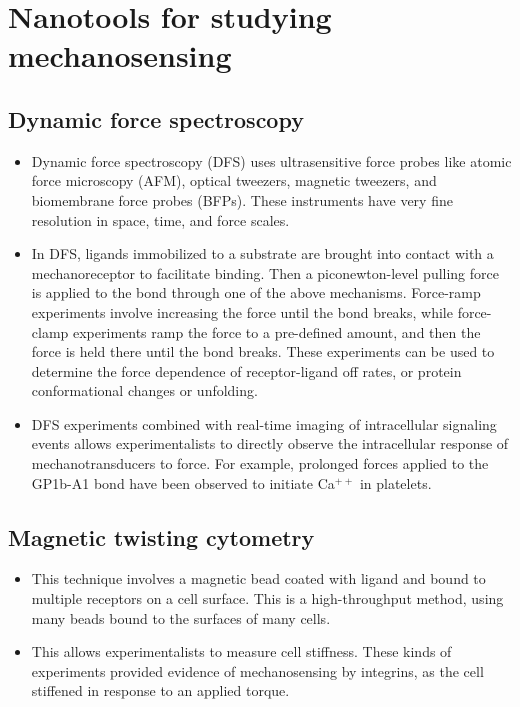 \documentclass[
10pt, %
letterpaper, %
twocolumn, %
landscape %
]{article}
\begin{document}

\section{Nanotools for studying mechanosensing}
\label{sec:nanot-study-mech}

\subsection{Dynamic force spectroscopy}
\label{sec:dynam-force-spectr}

\begin{itemize}
\item Dynamic force spectroscopy (DFS) uses ultrasensitive force
  probes like atomic force microscopy (AFM), optical tweezers,
  magnetic tweezers, and biomembrane force probes (BFPs). These
  instruments have very fine resolution in space, time, and force
  scales. 
\item In DFS, ligands immobilized to a substrate are brought into
  contact with a mechanoreceptor to facilitate binding. Then a
  piconewton-level pulling force is applied to the bond through one of
  the above mechanisms. Force-ramp experiments involve increasing the
  force until the bond breaks, while force-clamp experiments ramp the
  force to a pre-defined amount, and then the force is held there
  until the bond breaks. These experiments can be used to determine
  the force dependence of receptor-ligand off rates, or protein
  conformational changes or unfolding.
\item DFS experiments combined with real-time imaging of intracellular
  signaling events allows experimentalists to directly observe the
  intracellular response of mechanotransducers to force. For example,
  prolonged forces applied to the GP1b-A1 bond have been observed to
  initiate Ca$^{++}$ in platelets.
\end{itemize}

\subsection{Magnetic twisting cytometry}
\label{sec:magn-twist-cytom}

\begin{itemize}
\item This technique involves a magnetic bead coated with ligand and
  bound to multiple receptors on a cell surface. This is a
  high-throughput method, using many beads bound to the surfaces of
  many cells.
\item This allows experimentalists to measure cell stiffness. These
  kinds of experiments provided evidence of mechanosensing by
  integrins, as the cell stiffened in response to an applied torque.
\end{itemize}
\end{document}
